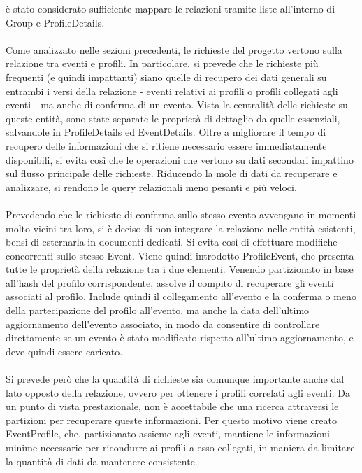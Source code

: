 è stato considerato sufficiente mappare le relazioni
tramite liste all'interno di Group e ProfileDetails.\\
\\
Come analizzato nelle sezioni precedenti,
le richieste del progetto vertono sulla relazione tra eventi e profili.
In particolare, si prevede che le richieste più frequenti
(e quindi impattanti)
siano quelle di recupero dei dati generali su entrambi i versi della relazione
- eventi relativi ai profili o profili collegati agli eventi -
ma anche di conferma di un evento.
\clearpage
Vista la centralità delle richieste su queste entità,
sono state separate le proprietà di dettaglio da quelle essenziali,
salvandole in ProfileDetails ed EventDetails.
Oltre a migliorare il tempo di recupero delle informazioni
che si ritiene necessario essere immediatamente disponibili, 
si evita così che le operazioni che vertono su dati secondari 
impattino sul flusso principale delle richieste.
Riducendo la mole di dati da recuperare e analizzare,
si rendono le query relazionali meno pesanti e più veloci.\\
\\
Prevedendo che le richieste di conferma sullo stesso evento 
avvengano in momenti molto vicini tra loro,
si è deciso di non integrare la relazione nelle entità esistenti,
bensì di esternarla in documenti dedicati.
Si evita così di effettuare modifiche concorrenti sullo stesso Event.
Viene quindi introdotto ProfileEvent,
che presenta tutte le proprietà della relazione tra i due elementi.
Venendo partizionato in base all'hash del profilo corrispondente,
assolve il compito di recuperare gli eventi associati al profilo.
Include quindi il collegamento all'evento e
la conferma o meno della partecipazione del profilo all'evento,
ma anche la data dell'ultimo aggiornamento dell'evento associato,
in modo da consentire di controllare direttamente
se un evento è stato modificato rispetto all'ultimo aggiornamento,
e deve quindi essere caricato.\\
\\
Si prevede però che la quantità di richieste sia comunque importante
anche dal lato opposto della relazione,
ovvero per ottenere i profili correlati agli eventi.
Da un punto di vista prestazionale, 
non è accettabile che una ricerca attraversi le partizioni per recuperare queste informazioni.
Per questo motivo viene creato EventProfile,
che, partizionato assieme agli eventi,
mantiene le informazioni minime necessarie per ricondurre ai profili a esso collegati,
in maniera da limitare la quantità di dati da mantenere consistente.\\
